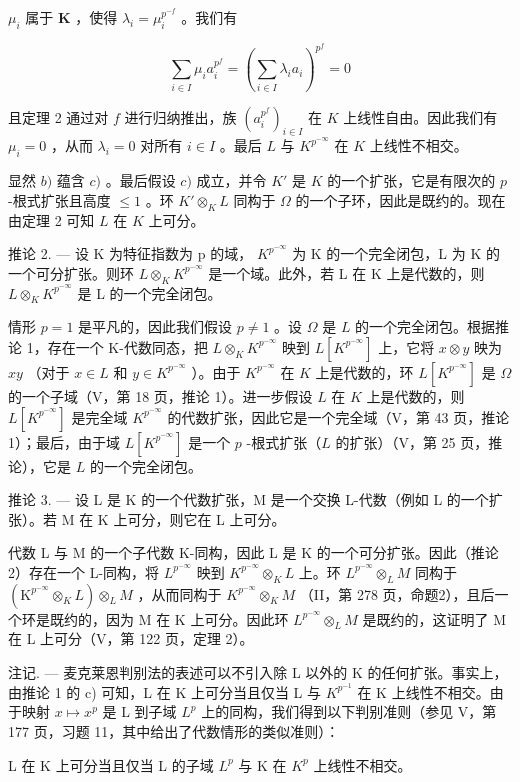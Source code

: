 \(\mu_{i}\) 属于 \(\mathbf{K}\) ，使得 \(\lambda_{i} = \mu_{i}^{p^{-f}}\) 。我们有

\[
\sum_ {i \in I} \mu_ {i} a _ {i} ^ {p ^ {f}} = \left(\sum_ {i \in I} \lambda_ {i} a _ {i}\right) ^ {p ^ {f}} = 0
\]

且定理 2 通过对 \(f\) 进行归纳推出，族 \((a_i^{p^f})_{i\in I}\) 在 \(K\) 上线性自由。因此我们有 \(\mu_i = 0\) ，从而 \(\lambda_i = 0\) 对所有 \(i\in I\) 。最后 \(L\) 与 \(K^{p^{-\infty}}\) 在 \(K\) 上线性不相交。

显然 \(b)\) 蕴含 \(c)\) 。最后假设 \(c)\) 成立，并令 \(K'\) 是 \(K\) 的一个扩张，它是有限次的 \(p\) -根式扩张且高度 \(\leqslant 1\) 。环 \(K' \otimes_K L\) 同构于 \(\Omega\) 的一个子环，因此是既约的。现在由定理 2 可知 \(L\) 在 \(K\) 上可分。

推论 2. --- 设 K 为特征指数为 p 的域， \(K^{p^{-\infty}}\) 为 K 的一个完全闭包，L 为 K 的一个可分扩张。则环 \(L \otimes_{K} K^{p^{-\infty}}\) 是一个域。此外，若 L 在 K 上是代数的，则 \(L \otimes_{K} K^{p^{-\infty}}\) 是 L 的一个完全闭包。

情形 \(p = 1\) 是平凡的，因此我们假设 \(p \neq 1\) 。设 \(\Omega\) 是 \(L\) 的一个完全闭包。根据推论 1，存在一个 K-代数同态，把 \(L \otimes_K K^{p^{-\infty}}\) 映到 \(L[K^{p^{-\infty}}]\) 上，它将 \(x \otimes y\) 映为 \(xy\) （对于 \(x \in L\) 和 \(y \in K^{p^{-\infty}}\) ）。由于 \(K^{p^{-\infty}}\) 在 \(K\) 上是代数的，环 \(L[K^{p^{-\infty}}]\) 是 \(\Omega\) 的一个子域（V，第 18 页，推论 1）。进一步假设 \(L\) 在 \(K\) 上是代数的，则 \(L[K^{p^{-\infty}}]\) 是完全域 \(K^{p^{-\infty}}\) 的代数扩张，因此它是一个完全域（V，第 43 页，推论 1）；最后，由于域 \(L[K^{p^{-\infty}}]\) 是一个 \(p\) -根式扩张（\(L\) 的扩张）（V，第 25 页，推论），它是 \(L\) 的一个完全闭包。

推论 3. --- 设 L 是 K 的一个代数扩张，M 是一个交换 L-代数（例如 L 的一个扩张）。若 M 在 K 上可分，则它在 L 上可分。

代数 L 与 M 的一个子代数 K-同构，因此 L 是 K 的一个可分扩张。因此（推论 2）存在一个 L-同构，将 \(L^{p^{-\infty}}\) 映到 \(K^{p^{-\infty}} \otimes_{K} L\) 上。环 \(L^{p^{-\infty}} \otimes_{L} M\) 同构于 \((\mathrm{K}^{p^{-\infty}} \otimes_{K} L) \otimes_{L} M\) ，从而同构于 \(K^{p^{-\infty}} \otimes_{K} M\) （II，第 278 页，命题2），且后一个环是既约的，因为 M 在 K 上可分。因此环 \(L^{p^{-\infty}} \otimes_{L} M\) 是既约的，这证明了 M 在 L 上可分（V，第 122 页，定理 2）。

注记. --- 麦克莱恩判别法的表述可以不引入除 L 以外的 K 的任何扩张。事实上，由推论 1 的 c) 可知，L 在 K 上可分当且仅当 L 与 \(K^{p^{-1}}\) 在 K 上线性不相交。由于映射 \(x \mapsto x^{p}\) 是 L 到子域 \(L^{p}\) 上的同构，我们得到以下判别准则（参见 V，第 177 页，习题 11，其中给出了代数情形的类似准则）：

L 在 K 上可分当且仅当 L 的子域 \(L^{p}\) 与 K 在 \(K^{p}\) 上线性不相交。

